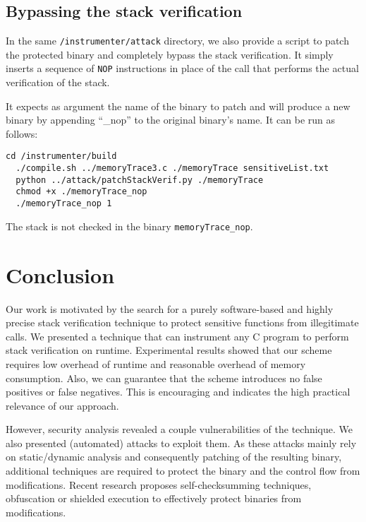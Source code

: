 \documentclass{llncs}
\begin{document}
\subsection{Bypassing the stack verification}
In the same \texttt{/instrumenter/attack} directory, we also provide a script to patch the protected binary and completely bypass the stack verification. It simply inserts a sequence of \texttt{NOP} instructions in place of the call that performs the actual verification of the stack.

It expects as argument the name of the binary to patch and will produce a new binary by appending ``\_nop'' to the original binary's name. It can be run as follows:
\begin{lstlisting}[basicstyle=\scriptsize]
  cd /instrumenter/build
  ./compile.sh ../memoryTrace3.c ./memoryTrace sensitiveList.txt
  python ../attack/patchStackVerif.py ./memoryTrace
  chmod +x ./memoryTrace_nop
  ./memoryTrace_nop 1
\end{lstlisting}
The stack is not checked in the binary \texttt{memoryTrace\_nop}.

\section{Conclusion}
Our work is motivated by the search for a purely software-based and highly precise stack verification technique to protect sensitive functions from illegitimate calls. We presented a technique that can instrument any C program to perform stack verification on runtime. Experimental results showed that our scheme requires low overhead of runtime and reasonable overhead of memory consumption. Also, we can guarantee that the scheme introduces no false positives or false negatives. This is encouraging and indicates the high practical relevance of our approach.

However, security analysis revealed a couple vulnerabilities of the technique. We also presented (automated) attacks to exploit them. As these attacks mainly rely on static/dynamic analysis and consequently patching of the resulting binary, additional techniques are required to protect the binary and the control flow from modifications. Recent research proposes self-checksumming techniques, obfuscation or shielded execution to effectively protect binaries from modifications.
\end{document}

